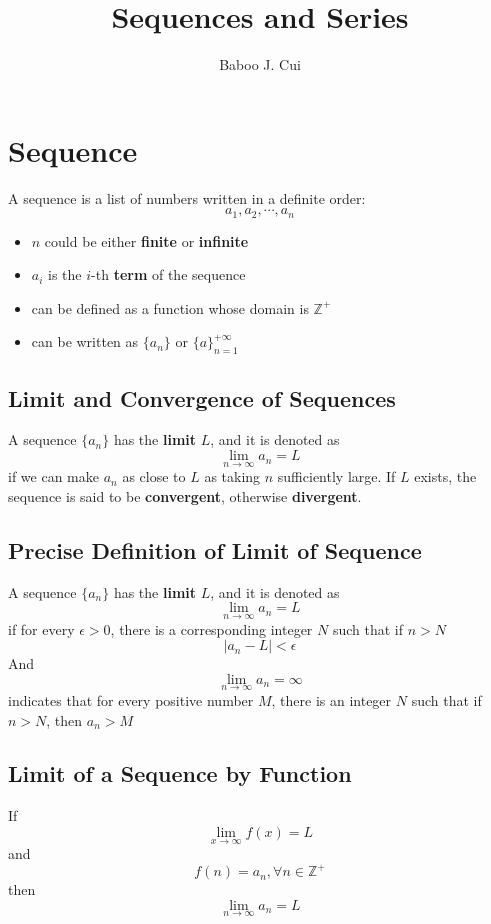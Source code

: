 \documentclass[10pt,a4paper,oneside]{article}
\author{Baboo J. Cui}
\title{Sequences and Series}
\begin{document}
\maketitle
\tableofcontents

\newpage

\section{Sequence}
A sequence is a list of numbers written in a definite order:
\[
a_1, a_2, \cdots, a_n
\]
\begin{itemize}
	\item  $n$ could be either \textbf{finite} or \textbf{infinite}
	\item $a_i$ is the $i$-th \textbf{term} of the sequence
	\item  can be defined as a function whose domain is $\mathbb{Z^+}$
	\item can be written as $\{a_n\}$ or $\{a\}_{n=1}^{+\infty}$
\end{itemize}

\subsection{Limit and Convergence of Sequences}
A sequence $\{a_n\}$ has the \textbf{limit} $L$, and it is denoted as
\[
\lim_{n \rightarrow \infty} a_n = L
\]
if we can make $a_n$ as close to $L$ as taking $n$ sufficiently large. If $L$ exists, the sequence is said to be \textbf{convergent}, otherwise \textbf{divergent}.

\subsection{Precise Definition of Limit of Sequence}
A sequence $\{a_n\}$ has the \textbf{limit} $L$, and it is denoted as
\[
\lim_{n \rightarrow \infty} a_n = L
\]
if for every $\epsilon>0$, there is a corresponding integer $N$ such that if $n>N$
\[
|a_n - L| < \epsilon
\]
And 
\[
\lim_{n \rightarrow \infty} a_n = \infty
\]
indicates that for every positive number $M$, there is an integer $N$ such that if $n>N$, then $a_n > M$

\subsection{Limit of a Sequence by Function}
If
\[
\lim_{x \rightarrow \infty} f(x) = L
\]
and
\[
f(n) = a_n, \forall n \in \mathbb{Z^+}
\]
then
\[
\lim_{n \rightarrow \infty} a_n = L
\]
\end{document}
